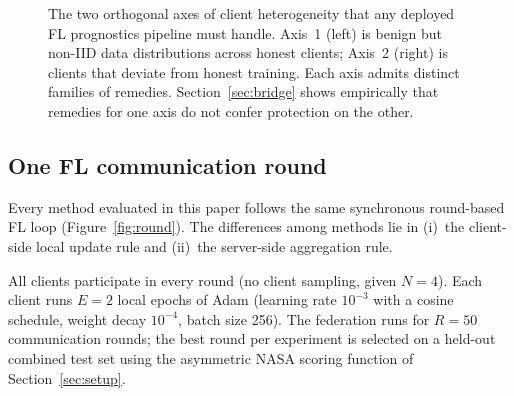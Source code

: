 \documentclass[preprint,12pt,authoryear]{elsarticle}
\begin{document}
\begin{figure}[!ht]
\centering
{}
\caption{The two orthogonal axes of client heterogeneity that any deployed FL prognostics pipeline must handle. Axis~1 (left) is benign but non-IID data distributions across honest clients; Axis~2 (right) is clients that deviate from honest training. Each axis admits distinct families of remedies. Section~\ref{sec:bridge} shows empirically that remedies for one axis do not confer protection on the other.}
\label{fig:two-axis}
\end{figure}

\subsection{One FL communication round}
\label{subsec:one-round}

Every method evaluated in this paper follows the same synchronous
round-based FL loop (Figure~\ref{fig:round}). The differences among
methods lie in (i)~the client-side local update rule and (ii)~the
server-side aggregation rule.

All clients participate in every round (no client sampling, given
$N = 4$). Each client runs $E = 2$ local epochs of Adam
(learning rate $10^{-3}$ with a cosine schedule, weight decay
$10^{-4}$, batch size 256). The federation runs for
$R = 50$ communication rounds; the best round per experiment is
selected on a held-out combined test set using the asymmetric
NASA scoring function of Section~\ref{sec:setup}.
\end{document}
